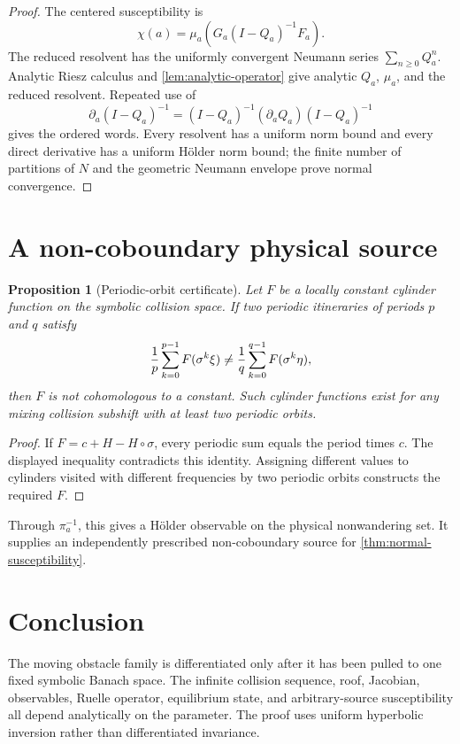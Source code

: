 \documentclass[11pt,reqno]{amsart}
\newtheorem{proposition}[theorem]{Proposition}
\theoremstyle{definition}
\theoremstyle{remark}
\begin{document}
\begin{proof}
The centered susceptibility is
\[
 \chi(a)=\mu_a\left(G_a(I-Q_a)^{-1}F_a\right).
\]
The reduced resolvent has the uniformly convergent Neumann series
$\sum_{n\ge0}Q_a^n$.  Analytic Riesz calculus and
\cref{lem:analytic-operator} give analytic $Q_a$, $\mu_a$, and the reduced
resolvent.  Repeated use of
\[
 \partial_a(I-Q_a)^{-1}
 =(I-Q_a)^{-1}(\partial_aQ_a)(I-Q_a)^{-1}
\]
gives the ordered words.  Every resolvent has a uniform norm bound and every
direct derivative has a uniform Hölder norm bound; the finite number of
partitions of $N$ and the geometric Neumann envelope prove normal convergence.
\end{proof}

\section{A non-coboundary physical source}

\begin{proposition}[Periodic-orbit certificate]\label{prop:noncoboundary}
Let $F$ be a locally constant cylinder function on the symbolic collision
space.  If two periodic itineraries of periods $p$ and $q$ satisfy
\[
 {1\over p}\sum_{k=0}^{p-1}F(\sigma^k\xi)
 \ne
 {1\over q}\sum_{k=0}^{q-1}F(\sigma^k\eta),
\]
then $F$ is not cohomologous to a constant.  Such cylinder functions exist for
any mixing collision subshift with at least two periodic orbits.
\end{proposition}

\begin{proof}
If $F=c+H-H\circ\sigma$, every periodic sum equals the period times $c$.
The displayed inequality contradicts this identity.  Assigning different
values to cylinders visited with different frequencies by two periodic orbits
constructs the required $F$.
\end{proof}

Through $\pi_a^{-1}$, this gives a Hölder observable on the physical
nonwandering set.  It supplies an independently prescribed non-coboundary
source for \cref{thm:normal-susceptibility}.

\section{Conclusion}

The moving obstacle family is differentiated only after it has been pulled to
one fixed symbolic Banach space.  The infinite collision sequence, roof,
Jacobian, observables, Ruelle operator, equilibrium state, and arbitrary-source
susceptibility all depend analytically on the parameter.  The proof uses
uniform hyperbolic inversion rather than differentiated invariance.



\end{document}
